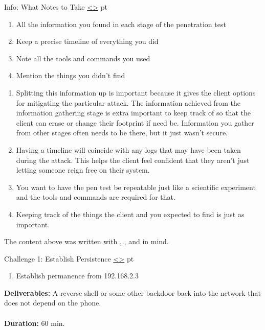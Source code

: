 \documentclass[12pt]{extarticle}
\newenvironment{instructionblock}{\Large\bgroup}{\egroup}
\newcounter{next}
\newcounter{prev}
\begin{document}
\pagebreak
{}
\begin{slide}{Info: What Notes to Take}
{\hyperref[slide \theprev]{\textless}\hyperref[slide \thenext]{\textgreater}}
	 pt
	\begin{instructionblock}
		\begin{enumerate}
            \item All the information you found in each stage of the penetration test
            \item Keep a precise timeline of everything you did
            \item Note all the tools and commands you used
            \item Mention the things you didn't find
		\end{enumerate}
	\end{instructionblock}
\end{slide}
\begin{enumerate}
\item Splitting this information up is important because it gives the client options for mitigating the particular attack. The information achieved from the information gathering stage is extra important to keep track of so that the client can erase or change their footprint if need be. Information you gather from other stages often needs to be there, but it just wasn't secure.
\item Having a timeline will coincide with any logs that may have been taken during the attack. This helps the client feel confident that they aren't just letting someone reign free on their system.
\item You want to have the pen test be repeatable just like a scientific experiment and the tools and commands are required for that.
\item Keeping track of the things the client and you expected to find is just as important.
\end{enumerate}
\begin{small}
	The content above was written with \cite{Ref:Sample1}, \cite{Ref:Sample2}, and \cite[Chapter 0]{Ref:Weidman} in mind.
\end{small}

\pagebreak
{}
\begin{slide}{Challenge 1: Establish Persistence}
{\hyperref[slide \theprev]{\textless}\hyperref[slide \thenext]{\textgreater}}
	 pt
	\begin{instructionblock}
		\begin{enumerate}
            \item Establish permanence from 192.168.2.3
		\end{enumerate}
        \textbf{Deliverables:} A reverse shell or some other backdoor back into the network that does not depend on the phone.\\\\
        \textbf{Duration:} 60 min.
	\end{instructionblock}
\end{slide}
\end{document}
